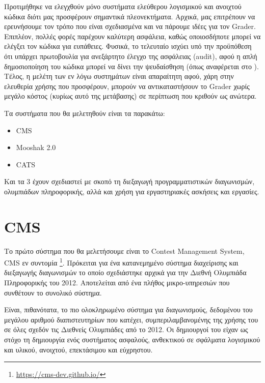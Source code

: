 \documentclass[diploma]{softlab-thesis}
\begin{document}
\bigskip

Προτιμήθηκε να ελεγχθούν μόνο συστήματα ελεύθερου λογισμικού και ανοιχτού
κώδικα διότι μας προσφέρουν σημαντικά πλεονεκτήματα. Αρχικά, μας επιτρέπουν να
ερευνήσουμε τον τρόπο που είναι σχεδιασμένα και να πάρουμε ιδέες για τον
Grader. Επιπλέον, πολλές φορές παρέχουν καλύτερη ασφάλεια, καθώς οποιοσδήποτε
μπορεί να ελέγξει τον κώδικα για ευπάθειες. Φυσικά, το τελευταίο ισχύει υπό την
προϋπόθεση ότι υπάρχει πρωτοβουλία για ανεξάρτητο έλεγχο της ασφάλειας (audit),
αφού η απλή δημοσιοποίηση του κώδικα μπορεί να δίνει την ψευδαίσθηση (όπως
αναφέρεται στο \cite{hansen2002open}). Τέλος, η μελέτη των εν λόγω συστημάτων
είναι απαραίτητη αφού, χάρη στην ελευθερία χρήσης που προσφέρουν, μπορούν να
αντικαταστήσουν το Grader χωρίς μεγάλο κόστος (κυρίως αυτό της μετάβασης) σε
περίπτωση που κριθούν ως ανώτερα.

\bigskip

Τα συστήματα που θα μελετηθούν είναι τα παρακάτω:

\begin{itemize}
    \setlength\itemsep{0em}
    \item CMS
    \item Mooshak 2.0
    \item CATS
\end{itemize}

Και τα 3 έχουν σχεδιαστεί με σκοπό τη διεξαγωγή προγραμματιστικών διαγωνισμών,
ολυμπιάδων πληροφορικής, αλλά και χρήση για εργαστηριακές ασκήσεις και
εργασίες.

\section{CMS}

Το πρώτο σύστημα που θα μελετήσουμε είναι το Contest Management System, CMS εν
συντομία \footnote{\url{https://cms-dev.github.io/}}. Πρόκειται για ένα κατανεμημένο σύστημα διαχείρισης και διεξαγωγής
διαγωνισμών το οποίο σχεδιάστηκε αρχικά για την Διεθνή Ολυμπιάδα Πληροφορικής
του 2012. Αποτελείται από ένα πλήθος μικρο-υπηρεσιών που συνθέτουν το συνολικό
σύστημα.

\bigskip

Είναι, πιθανότατα, το πιο ολοκληρωμένο σύστημα για διαγωνισμούς, δεδομένου του
μεγάλου αριθμού διαπιστευτηρίων που κατέχει, συμπεριλαμβανομένης της χρήσης του
σε όλες σχεδόν τις Διεθνείς Ολυμπιάδες από το 2012. Οι δημιουργοί του είχαν ως
στόχο τη δημιουργία ενός συστήματος ασφαλούς, ανθεκτικού σε σφάλματα λογισμικού
και υλικού, ανοιχτού, επεκτάσιμου και εύχρηστου.
\end{document}
